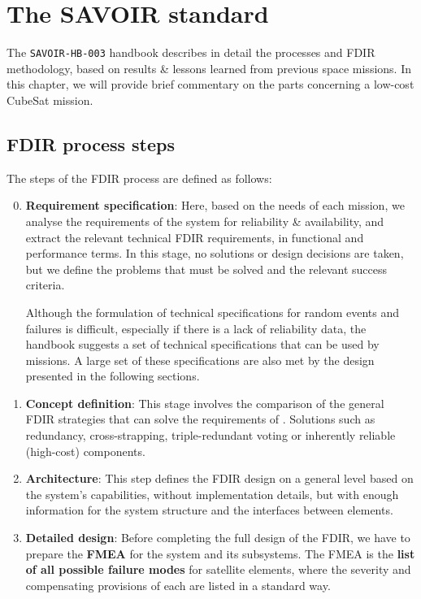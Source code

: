 \documentclass[a4paper,nobib]{tufte-book}
\begin{document}
\section{The SAVOIR standard}
The \texttt{SAVOIR-HB-003} handbook describes in detail the processes and \acs{FDIR} methodology, based on results \& lessons learned from previous space missions. In this chapter, we will provide brief commentary on the parts concerning a low-cost CubeSat mission.

\subsection{\acs{FDIR} process steps}

The steps of the \acs{FDIR} process are defined as follows:
\begin{enumerate}
	\setcounter{enumi}{-1}
	\item \textbf{Requirement specification}: Here, based on the needs of each mission, we analyse the requirements of the system for reliability \& availability, and extract the relevant technical \acs{FDIR} requirements, in functional and performance terms. In this stage, no solutions or design decisions are taken, but we define the problems that must be solved and the relevant success criteria.
	\label{itm:fdir_reqs}

	
	Although the formulation of technical specifications for random events and failures is difficult, especially if there is a lack of reliability data, the handbook suggests a set of technical specifications \autocite[42]{SAVOIR-HB-003} that can be used by missions. A large set of these specifications are also met by the design presented in the following sections.
	
	\item \textbf{Concept definition}: This stage involves the comparison of the general \acs{FDIR} strategies that can solve the requirements of . Solutions such as redundancy, cross-strapping, triple-redundant voting or inherently reliable (high-cost) components.
	
	
	\label{itm:fdir_concept}

	\item \textbf{Architecture}: This step defines the \acs{FDIR} design on a general level based on the system's capabilities, without implementation details, but with enough information for the system structure and the interfaces between elements.
	
	\item \textbf{Detailed design}: Before completing the full design of the \acs{FDIR}, we have to prepare the \textbf{\acf{FMEA}} \autocite{carlson_effective_fmeas_2012} for the system and its subsystems. The \acs{FMEA} is the \textbf{list of all possible failure modes} for satellite elements, where the severity and compensating provisions of each are listed in a standard way.
	

\end{enumerate}
\end{document}
